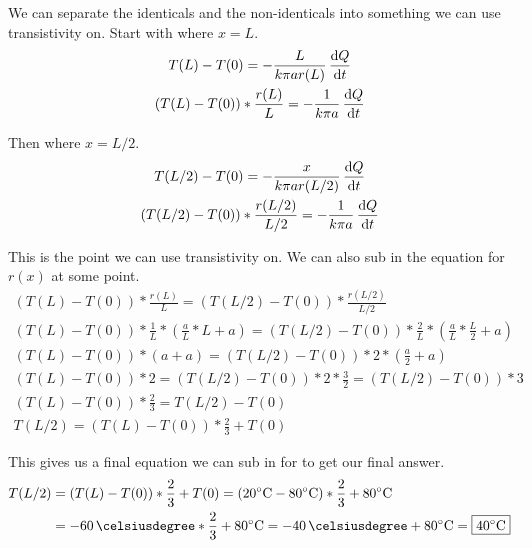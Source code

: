 \documentclass[12pt]{article}
\begin{document}
            We can separate the identicals and the non-identicals into something we can use transistivity on.
            Start with where $x = L$.
            \begin{gather}
                T(L) - T(0) =   -\frac{L}{k \pi ar(L)}\,\dv{Q}{t}\\
                (T(L) - T(0)) * \frac{r(L)}{L} =   -\frac{1}{k \pi a}\,\dv{Q}{t}
            \end{gather}

            Then where $x = L/2$.
            \begin{gather}
                T(L/2) - T(0) =   -\frac{x}{k \pi ar(L/2)}\,\dv{Q}{t}\\
                (T(L/2) - T(0)) * \frac{r(L/2)}{L/2} =   -\frac{1}{k \pi a}\,\dv{Q}{t}
            \end{gather}

            This is the point we can use transistivity on.
            We can also sub in the equation for $r(x)$ at some point.
            {   \small
            \begin{gather}
                (T(L) - T(0)) * \frac{r(L)}{L} = (T(L/2) - T(0)) * \frac{r(L/2)}{L/2}\\
                (T(L) - T(0)) * \frac{1}{L} * \left( \frac{a}{L} * L + a \right) = (T(L/2) - T(0)) * \frac{2}{L} * \left( \frac{a}{L} * \frac{L}{2} + a \right)\\
                (T(L) - T(0)) * \left( a + a \right) = (T(L/2) - T(0)) * 2 * \left( \frac{a}{2} + a \right)\\
                (T(L) - T(0)) * 2 = (T(L/2) - T(0)) * 2 * \frac{3}{2} = (T(L/2) - T(0)) * 3\\
                (T(L) - T(0)) * \frac{2}{3} = T(L/2) - T(0)\\
                T(L/2)  =   (T(L) - T(0)) * \frac{2}{3} + T(0)
            \end{gather}    }

            This gives us a final equation we can sub in for to get our final answer.
            \begin{align}
                T(L/2)  &=  (T(L) - T(0)) * \frac{2}{3} + T(0)
                    =   (20\unit{\celsius} - 80\unit{\celsius}) * \frac{2}{3} + 80\unit{\celsius}\\
                    &=  -60\,\unit{\celsiusdegree} * \frac{2}{3} + 80\unit{\celsius}
                    =   -40\,\unit{\celsiusdegree} + 80\unit{\celsius}
                    =   \boxed{40\unit{\celsius}}
            \end{align}
\end{document}
